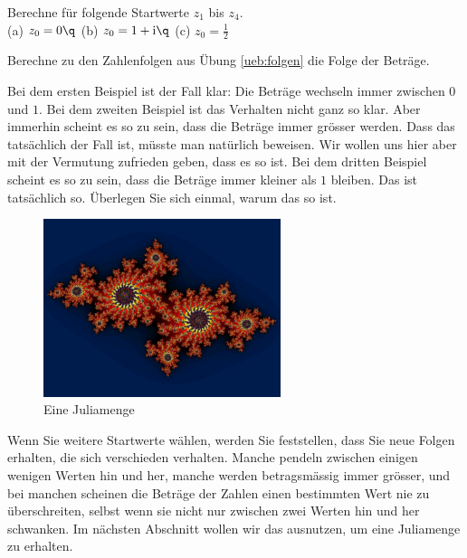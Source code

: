 \documentclass[%
11pt,%
twoside,%
titlepage,%
german,%
headsepline%
]{scrartcl}
\begin{document}
\begin{ueb}[Startwerte]\label{ueb:folgen}
Berechne f\"ur folgende Startwerte $z_1$ bis $z_4$.\\

(a) $z_0=0\q$ (b) $z_0=1+\mathrm{i}\q$ (c) $z_0=\frac{1}{2}$
\end{ueb}

\begin{ueb}[Beträge]
Berechne zu den Zahlenfolgen aus Übung \ref{ueb:folgen} die Folge der Beträge.
\end{ueb}

Bei dem ersten Beispiel ist der Fall klar: Die Beträge wechseln immer zwischen $0$ und $1$. Bei dem zweiten Beispiel ist das Verhalten nicht ganz so klar. Aber immerhin scheint es so zu sein, dass die Beträge immer gr\"osser werden. Dass das tatsächlich der Fall ist, m\"usste man nat\"urlich beweisen. Wir wollen uns hier aber mit der Vermutung zufrieden geben, dass es so ist. Bei dem dritten Beispiel scheint es so zu sein, dass die Beträge immer kleiner als $1$ bleiben. Das ist tatsächlich so. \"Uberlegen Sie sich einmal, warum das so ist.

\begin{figure}
\begin{center}
\includegraphics[width=0.618\textwidth]{pictures/julia1}
\end{center}
\caption{Eine Juliamenge}
\end{figure}

Wenn Sie weitere Startwerte wählen, werden Sie feststellen, dass Sie neue Folgen erhalten, die sich verschieden verhalten. Manche pendeln zwischen einigen wenigen Werten hin und her, manche werden betragsmässig immer gr\"osser, und bei manchen scheinen die Beträge der Zahlen einen bestimmten Wert nie zu \"uberschreiten, selbst wenn sie nicht nur zwischen zwei Werten hin und her schwanken. Im nächsten Abschnitt wollen wir das ausnutzen, um eine Juliamenge zu erhalten.
\end{document}
